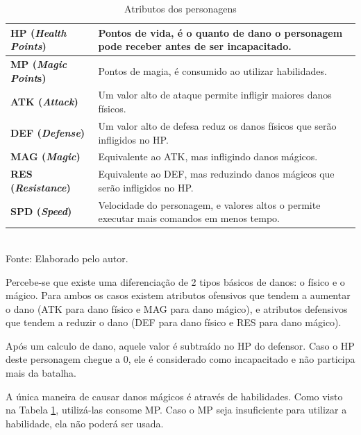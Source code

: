 \documentclass[
	12pt,					%
	openright,				%
	oneside,				%
	a4paper,				%
	bibjustif,				%
	chapter=TITLE,			%
	english,				%
	brazil,					%
	]{abntex2}
\newcommand{\source}[1]{\small Fonte: {#1}}
\begin{document}
	\begin{table}[h]
		\caption{Atributos dos personagens}
		\centering
		\small
		\renewcommand{\arraystretch}{1.2} %
		\begin{tabular}{>{\centering\arraybackslash}m{3.5cm} m{11.5cm}}
			\hline 
			\textbf{HP (\textit{Health Points})} & Pontos de vida, é o quanto de dano o personagem pode receber antes de ser incapacitado. \\ 
			\hline 
			\textbf{MP (\textit{Magic Point}s)} & Pontos de magia, é consumido ao utilizar habilidades. \\ 
			\hline 
			\textbf{ATK (\textit{Attack})} & Um valor alto de ataque permite infligir maiores danos físicos. \\ 
			\hline 
			\textbf{DEF (\textit{Defense})} & Um valor alto de defesa reduz os danos físicos que serão infligidos no HP. \\ 
			\hline 
			\textbf{MAG (\textit{Magic})} & Equivalente ao ATK, mas infligindo danos mágicos. \\ 
			\hline 
			\textbf{RES (\textit{Resistance})} & Equivalente ao DEF, mas reduzindo danos mágicos que serão infligidos no HP. \\ 
			\hline 
			\textbf{SPD (\textit{Speed})} & Velocidade do personagem, e valores altos o permite executar mais comandos em menos tempo. \\ 
			\hline 
		\end{tabular}\\
		\vspace{3mm}
		\source{Elaborado pelo autor.}
		\label{tab:characterStats}
	\end{table}
	
	Percebe-se que existe uma diferenciação de 2 tipos básicos de danos:
	o físico e o mágico.
	Para ambos os casos
	existem atributos ofensivos que tendem a aumentar o dano (ATK para dano físico e MAG para dano mágico),
	e atributos defensivos que tendem a reduzir o dano (DEF para dano físico e RES para dano mágico).
	
	Após um calculo de dano,
	aquele valor é subtraído no HP do defensor.
	Caso o HP deste personagem chegue a 0,
	ele é considerado como incapacitado e não participa mais da batalha.
	
	A única maneira de causar danos mágicos é através de habilidades.
	Como visto na Tabela \ref{tab:characterStats},
	utilizá-las consome MP.
	Caso o MP seja insuficiente para utilizar a habilidade,
	ela não poderá ser usada.
	
\end{document}
